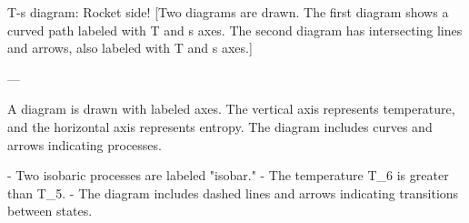 T-s diagram: Rocket side!  
[Two diagrams are drawn. The first diagram shows a curved path labeled with T and s axes. The second diagram has intersecting lines and arrows, also labeled with T and s axes.]

---

A diagram is drawn with labeled axes. The vertical axis represents temperature, and the horizontal axis represents entropy. The diagram includes curves and arrows indicating processes.  

- Two isobaric processes are labeled "isobar."  
- The temperature T_6 is greater than T_5.  
- The diagram includes dashed lines and arrows indicating transitions between states.